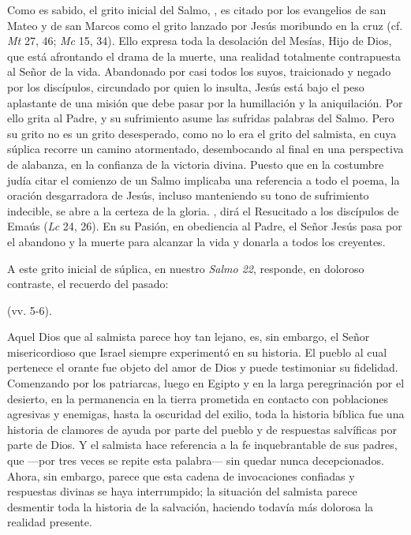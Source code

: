 \begin{body}
Como es sabido, el grito inicial del Salmo, , es citado por los evangelios de san Mateo y de san Marcos como el grito lanzado por Jesús moribundo en la cruz (cf. \emph{Mt} 27, 46; \emph{Mc} 15, 34). Ello expresa toda la desolación del Mesías, Hijo de Dios, que está afrontando el drama de la muerte, una realidad totalmente contrapuesta al Señor de la vida. Abandonado por casi todos los suyos, traicionado y negado por los discípulos, circundado por quien lo insulta, Jesús está bajo el peso aplastante de una misión que debe pasar por la humillación y la aniquilación. Por ello grita al Padre, y su sufrimiento asume las sufridas palabras del Salmo. Pero su grito no es un grito desesperado, como no lo era el grito del salmista, en cuya súplica recorre un camino atormentado, desembocando al final en una perspectiva de alabanza, en la confianza de la victoria divina. Puesto que en la costumbre judía citar el comienzo de un Salmo implicaba una referencia a todo el poema, la oración desgarradora de Jesús, incluso manteniendo su tono de sufrimiento indecible, se abre a la certeza de la gloria. , dirá el Resucitado a los discípulos de Emaús (\emph{Lc} 24, 26). En su Pasión, en obediencia al Padre, el Señor Jesús pasa por el abandono y la muerte para alcanzar la vida y donarla a todos los creyentes. 

A este grito inicial de súplica, en nuestro \emph{Salmo 22}, responde, en doloroso contraste, el recuerdo del pasado: 

 (vv. 5-6). 

Aquel Dios que al salmista parece hoy tan lejano, es, sin embargo, el Señor misericordioso que Israel siempre experimentó en su historia. El pueblo al cual pertenece el orante fue objeto del amor de Dios y puede testimoniar su fidelidad. Comenzando por los patriarcas, luego en Egipto y en la larga peregrinación por el desierto, en la permanencia en la tierra prometida en contacto con poblaciones agresivas y enemigas, hasta la oscuridad del exilio, toda la historia bíblica fue una historia de clamores de ayuda por parte del pueblo y de respuestas salvíficas por parte de Dios. Y el salmista hace referencia a la fe inquebrantable de sus padres, que  ---por tres veces se repite esta palabra--- sin quedar nunca decepcionados. Ahora, sin embargo, parece que esta cadena de invocaciones confiadas y respuestas divinas se haya interrumpido; la situación del salmista parece desmentir toda la historia de la salvación, haciendo todavía más dolorosa la realidad presente. 


\end{body}

